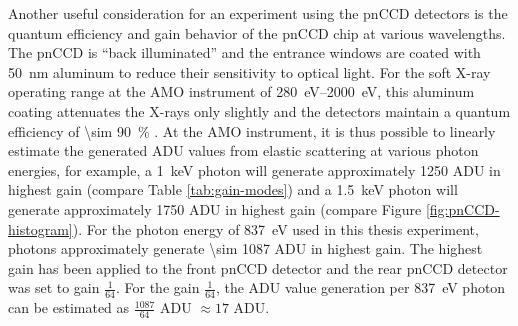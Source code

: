 Another useful consideration for an experiment using the pnCCD detectors is the quantum efficiency and gain behavior of the pnCCD chip at various wavelengths. The pnCCD is ``back illuminated'' and the entrance windows are coated with \SI{50}{\nano\meter} aluminum to reduce their sensitivity to optical light. For the soft X-ray operating range at the AMO instrument of \SIrange{280}{2000}{\electronvolt}, this aluminum coating attenuates the X-rays only slightly and the detectors maintain a quantum efficiency of \SI{\sim 90}{\percent} \cite{Strueder-2010-NIMPA}. At the AMO instrument, it is thus possible to linearly estimate the generated ADU values from elastic scattering at various photon energies, for example, a \SI{1}{\kilo\electronvolt} photon will generate approximately \num{1250} ADU in highest gain (compare Table \ref{tab:gain-modes}) and a \SI{1.5}{\kilo\electronvolt} photon will generate approximately \num{1750} ADU in highest gain (compare Figure \ref{fig:pnCCD-histogram}). For the photon energy of \SI{837}{\electronvolt} used in this thesis experiment, photons approximately generate \num{\sim 1087} ADU in highest gain. The highest gain has been applied to the front pnCCD detector and the rear pnCCD detector was set to gain $\tfrac{1}{64}$. For the gain $\tfrac{1}{64}$, the ADU value generation per \SI{837}{\electronvolt} photon can be estimated as $\tfrac{1087}{64}$ ADU $\approx 17$ ADU.
%
%
%
%
%
